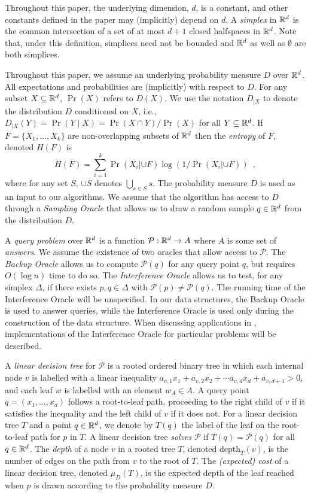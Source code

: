\documentclass{patmorin}
\newcommand{\depth}{\mathrm{depth}}
\begin{document}
Throughout this paper, the underlying dimension, $d$, is a constant, and
other constants defined in the paper may (implicitly) depend on $d$.
A \emph{simplex} in $\mathbb{R}^d$ is the common intersection of a set of at most
$d+1$ closed halfspaces in $\mathbb{R}^d$. Note that, under this definition,
simplices need not be bounded and $\mathbb{R}^d$ as well as $\emptyset$ are
both simplices.


Throughout this paper, we assume an underlying probability measure
$D$ over $\mathbb{R}^d$.  All expectations and probabilities are (implicitly)
with respect to $D$.  For any subset $X\subseteq\mathbb{R}^d$, $\Pr(X)$ refers
to $D(X)$.  We use the notation $D_{|X}$ to denote the distribution $D$
conditioned on $X$, i.e., $D_{|X}(Y)=\Pr(Y\mid X)=\Pr(X\cap Y)/\Pr(X)$
for all $Y\subseteq\mathbb{R}^d$.  If $F=\{X_1,\ldots,X_k\}$ are non-overlapping
subsets of $\mathbb{R}^d$ then the \emph{entropy} of $F$, denoted $H(F)$ is
\[
    H(F) = \sum_{i=1}^k \Pr(X_i|{\cup F})\log(1/\Pr(X_i|{\cup F})) \enspace ,
\]
where for any set $S$, $\cup S$ denotes $\bigcup_{s\in S} s$.
The probability measure $D$ is used as an input to our algorithms.
We assume that the algorithm has access to $D$ through a \emph{Sampling
Oracle} that allows us to draw a random sample $q\in\mathbb{R}^d$ from the
distribution $D$.

A \emph{query problem} over $\mathbb{R}^d$ is a function
$\mathcal{P}:\mathbb{R}^d\rightarrow A$ where $A$ is some set of \emph{answers}.
We assume the existence of two oracles that allow access to $\mathcal{P}$.
The \emph{Backup Oracle} allows us to compute $\mathcal{P}(q)$ for
any query point $q$, but requires $O(\log n)$ time to do so.  The
\emph{Interference Oracle} allows us to test, for any simplex $\Delta$,
if there exists $p,q\in\Delta$ with $\mathcal{P}(p)\neq\mathcal{P}(q)$.
The running time of the Interference Oracle will be unspecified.
In our data structures, the Backup Oracle is used to answer queries,
while the Interference Oracle is used only during the construction of the
data structure.  When discussing applications in ,
implementations of the Interference Oracle for particular problems will
be described.

A \emph{linear decision tree} for $\mathcal{P}$ is a rooted ordered
binary tree in which each internal node $v$ is labelled with a linear
inequality $a_{v,1}x_1 + a_{v,2}x_2 + \cdots a_{v,d}x_d + a_{v,d+1} > 0$,
and each leaf $w$ is labelled with an element $w_A\in A$.  A query point
$q=(x_1,\ldots,x_d)$ follows a root-to-leaf path, proceeding to the right
child of $v$ if it satisfies the inequality and the left child of $v$
if it does not.  For a linear decision tree $T$ and a point $q\in\mathbb{R}^d$,
we denote by $T(q)$ the label of the leaf on the root-to-leaf path
for $p$ in $T$.  A linear decision tree \emph{solves} $\mathcal{P}$ if
$T(q)=\mathcal{P}(q)$ for all $q\in\mathbb{R}^d$. The \emph{depth} of a node $v$
in a rooted tree $T$, denoted $\depth_T(v)$, is the number of edges on
the path from $v$ to the root of $T$.  The \emph{(expected) cost} of a
linear decision tree, denoted $\mu_D(T)$, is the expected depth of the
leaf reached when $p$ is drawn according to the probability measure $D$.
\end{document}
